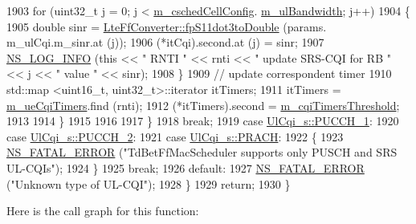 \begin{DoxyCode}
1903             \textcolor{keywordflow}{for} (uint32\_t j = 0; j < \hyperlink{classns3_1_1TdBetFfMacScheduler_a3e53aae0259501332769cd6ca4b74800}{m\_cschedCellConfig}.
      \hyperlink{structns3_1_1FfMacCschedSapProvider_1_1CschedCellConfigReqParameters_a5ab5b102878e6e7e7727a14af4a64d2f}{m\_ulBandwidth}; j++)
1904               \{
1905                 \textcolor{keywordtype}{double} sinr = \hyperlink{classns3_1_1LteFfConverter_aa5d8c2a8f988dbd63da91818c18666eb}{LteFfConverter::fpS11dot3toDouble} (params.
      m\_ulCqi.m\_sinr.at (j));
1906                 (*itCqi).second.at (j) = sinr;
1907                 \hyperlink{group__logging_gafbd73ee2cf9f26b319f49086d8e860fb}{NS\_LOG\_INFO} (\textcolor{keyword}{this} << \textcolor{stringliteral}{" RNTI "} << rnti << \textcolor{stringliteral}{" update SRS-CQI for RB  "} << j << \textcolor{stringliteral}{"
       value "} << sinr);
1908               \}
1909             \textcolor{comment}{// update correspondent timer}
1910             std::map <uint16\_t, uint32\_t>::iterator itTimers;
1911             itTimers = \hyperlink{classns3_1_1TdBetFfMacScheduler_a89b7106fc5de30b9153316aa3ea2d368}{m\_ueCqiTimers}.find (rnti);
1912             (*itTimers).second = \hyperlink{classns3_1_1TdBetFfMacScheduler_ad423d7c181e089b37159502bad92bccd}{m\_cqiTimersThreshold};
1913 
1914           \}
1915 
1916 
1917       \}
1918       \textcolor{keywordflow}{break};
1919     \textcolor{keywordflow}{case} \hyperlink{structns3_1_1UlCqi__s_aece9e5ebea42eb9ff1744c72c8459b57a05ca6554bc6fcd96a0a51fbaa8e794c7}{UlCqi\_s::PUCCH\_1}:
1920     \textcolor{keywordflow}{case} \hyperlink{structns3_1_1UlCqi__s_aece9e5ebea42eb9ff1744c72c8459b57a35664b4bda6f1cd6acfe9edc84c7571d}{UlCqi\_s::PUCCH\_2}:
1921     \textcolor{keywordflow}{case} \hyperlink{structns3_1_1UlCqi__s_aece9e5ebea42eb9ff1744c72c8459b57af93f36792cb1eed08f6119e4abfe58e8}{UlCqi\_s::PRACH}:
1922       \{
1923         \hyperlink{group__fatal_ga5131d5e3f75d7d4cbfd706ac456fdc85}{NS\_FATAL\_ERROR} (\textcolor{stringliteral}{"TdBetFfMacScheduler supports only PUSCH and SRS UL-CQIs"});
1924       \}
1925       \textcolor{keywordflow}{break};
1926     \textcolor{keywordflow}{default}:
1927       \hyperlink{group__fatal_ga5131d5e3f75d7d4cbfd706ac456fdc85}{NS\_FATAL\_ERROR} (\textcolor{stringliteral}{"Unknown type of UL-CQI"});
1928     \}
1929   \textcolor{keywordflow}{return};
1930 \}
\end{DoxyCode}


Here is the call graph for this function\+:




